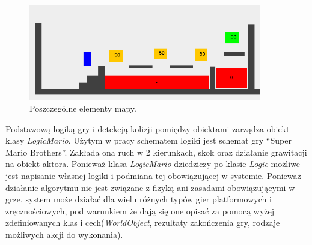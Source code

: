 \begin{par}
	\begin{figure}[!h]
		\centering
		\includegraphics[width=4in]{obrazki/objects.png}
		\caption{Poszczególne elementy mapy.}
		\label{fig:objects}
	\end{figure}
\end{par}

\begin{par}
	Podstawową logiką gry i detekcją kolizji pomiędzy obiektami zarządza obiekt klasy \textit{LogicMario}. Użytym w pracy schematem logiki jest schemat gry ``Super Mario Brothers''. 
	Zakłada ona ruch w 2 kierunkach, skok oraz działanie grawitacji na obiekt aktora.
	Ponieważ klasa \textit{LogicMario} dziedziczy po klasie \textit{Logic} możliwe jest napisanie własnej logiki i podmiana tej obowiązującej w systemie.
	Ponieważ działanie algorytmu nie jest związane z fizyką ani zasadami obowiązującymi w grze, system może działać dla wielu różnych typów gier platformowych i zręcznościowych, pod warunkiem że dają się one opisać za pomocą wyżej zdefiniowanych klas i cech(\textit{WorldObject}, rezultaty zakończenia gry, rodzaje możliwych akcji do wykonania).
\end{par}

